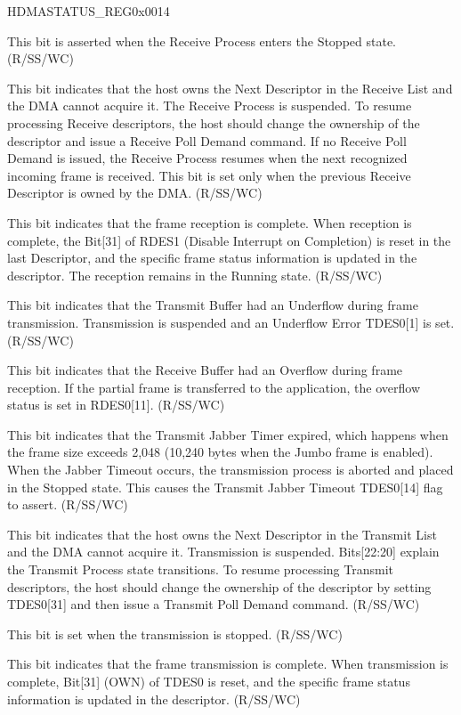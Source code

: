\addtocounter{Regfloat}{-1}
\begin{register}{H}{DMASTATUS\_REG}{0x0014}
\begin{regdesc}\begin{reglist}
\item [Continued from the previous page...]
\item [RECV\_PROC\_STOP]This bit is asserted when the Receive Process enters the Stopped state. (R/SS/WC)
\item [RECV\_BUF\_UNAVAIL]This bit indicates that the host owns the Next Descriptor in the Receive List and the DMA cannot acquire it. The Receive Process is suspended. To resume processing Receive descriptors, the host should change the ownership of the descriptor and issue a Receive Poll Demand command. If no Receive Poll Demand is issued, the Receive Process resumes when the next recognized incoming frame is received. This bit is set only when the previous Receive Descriptor is owned by the DMA. (R/SS/WC)
\item [RECV\_INT]This bit indicates that the frame reception is complete. When reception is complete, the Bit[31] of RDES1 (Disable Interrupt on Completion) is reset in the last Descriptor, and the specific frame status information is updated in the descriptor. The reception remains in the Running state. (R/SS/WC)
\item [TRANS\_UNDFLOW]This bit indicates that the Transmit Buffer had an Underflow during frame transmission. Transmission is suspended and an Underflow Error TDES0[1] is set. (R/SS/WC)
\item [RECV\_OVFLOW]This bit indicates that the Receive Buffer had an Overflow during frame reception. If the partial frame is transferred to the application, the overflow status is set in RDES0[11]. (R/SS/WC)
\item [TRANS\_JABBER\_TO]This bit indicates that the Transmit Jabber Timer expired, which happens when the frame size exceeds 2,048 (10,240 bytes when the Jumbo frame is enabled). When the Jabber Timeout occurs, the transmission process is aborted and placed in the Stopped state. This causes the Transmit Jabber Timeout TDES0[14] flag to assert. (R/SS/WC)
\item [TRANS\_BUF\_UNAVAIL]This bit indicates that the host owns the Next Descriptor in the Transmit List and the DMA cannot acquire it. Transmission is suspended. Bits[22:20] explain the Transmit Process state transitions. To resume processing Transmit descriptors, the host should change the ownership of the descriptor by setting TDES0[31] and then issue a Transmit Poll Demand command. (R/SS/WC)
\item [TRANS\_PROC\_STOP]This bit is set when the transmission is stopped. (R/SS/WC)
\item [TRANS\_INT]This bit indicates that the frame transmission is complete. When transmission is complete, Bit[31] (OWN) of TDES0 is reset, and the specific frame status information is updated in the descriptor. (R/SS/WC)
\end{reglist}\end{regdesc}
\end{register}


